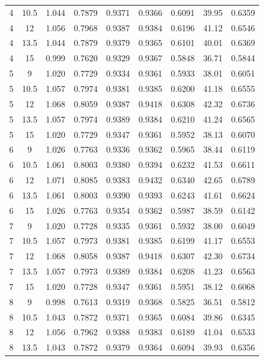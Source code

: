 \documentclass[12pt,a4paper,fontset=fandol]{ctexart}
\begin{document}
\begin{longtable}{ccccccccc}
    4 & 10.5 & 1.044 & 0.7879 & 0.9371 & 0.9366 & 0.6091 & 39.95 & 0.6359 \\
    4 & 12 & 1.056 & 0.7968 & 0.9387 & 0.9384 & 0.6196 & 41.12 & 0.6546 \\
    4 & 13.5 & 1.044 & 0.7879 & 0.9379 & 0.9365 & 0.6101 & 40.01 & 0.6369 \\
    4 & 15 & 0.999 & 0.7620 & 0.9329 & 0.9367 & 0.5848 & 36.71 & 0.5844 \\
    5 & 9 & 1.020 & 0.7729 & 0.9334 & 0.9361 & 0.5933 & 38.01 & 0.6051 \\
    5 & 10.5 & 1.057 & 0.7974 & 0.9381 & 0.9385 & 0.6200 & 41.18 & 0.6555 \\
    5 & 12 & 1.068 & 0.8059 & 0.9387 & 0.9418 & 0.6308 & 42.32 & 0.6736 \\
    5 & 13.5 & 1.057 & 0.7974 & 0.9389 & 0.9384 & 0.6210 & 41.24 & 0.6565 \\
    5 & 15 & 1.020 & 0.7729 & 0.9347 & 0.9361 & 0.5952 & 38.13 & 0.6070 \\
    6 & 9 & 1.026 & 0.7763 & 0.9336 & 0.9362 & 0.5965 & 38.44 & 0.6119 \\
    6 & 10.5 & 1.061 & 0.8003 & 0.9380 & 0.9394 & 0.6232 & 41.53 & 0.6611 \\
    6 & 12 & 1.071 & 0.8085 & 0.9383 & 0.9432 & 0.6340 & 42.65 & 0.6789 \\
    6 & 13.5 & 1.061 & 0.8003 & 0.9390 & 0.9393 & 0.6243 & 41.61 & 0.6624 \\
    6 & 15 & 1.026 & 0.7763 & 0.9354 & 0.9362 & 0.5987 & 38.59 & 0.6142 \\
    7 & 9 & 1.020 & 0.7728 & 0.9335 & 0.9361 & 0.5932 & 38.00 & 0.6049 \\
    7 & 10.5 & 1.057 & 0.7973 & 0.9381 & 0.9385 & 0.6199 & 41.17 & 0.6553 \\
    7 & 12 & 1.068 & 0.8058 & 0.9387 & 0.9418 & 0.6307 & 42.30 & 0.6734 \\
    7 & 13.5 & 1.057 & 0.7973 & 0.9389 & 0.9384 & 0.6208 & 41.23 & 0.6563 \\
    7 & 15 & 1.020 & 0.7728 & 0.9347 & 0.9361 & 0.5951 & 38.12 & 0.6068 \\
    8 & 9 & 0.998 & 0.7613 & 0.9319 & 0.9368 & 0.5825 & 36.51 & 0.5812 \\
    8 & 10.5 & 1.043 & 0.7872 & 0.9371 & 0.9365 & 0.6084 & 39.86 & 0.6345 \\
    8 & 12 & 1.056 & 0.7962 & 0.9388 & 0.9383 & 0.6189 & 41.04 & 0.6533 \\
    8 & 13.5 & 1.043 & 0.7872 & 0.9379 & 0.9364 & 0.6094 & 39.93 & 0.6356 \\

\end{longtable}
\end{document}
